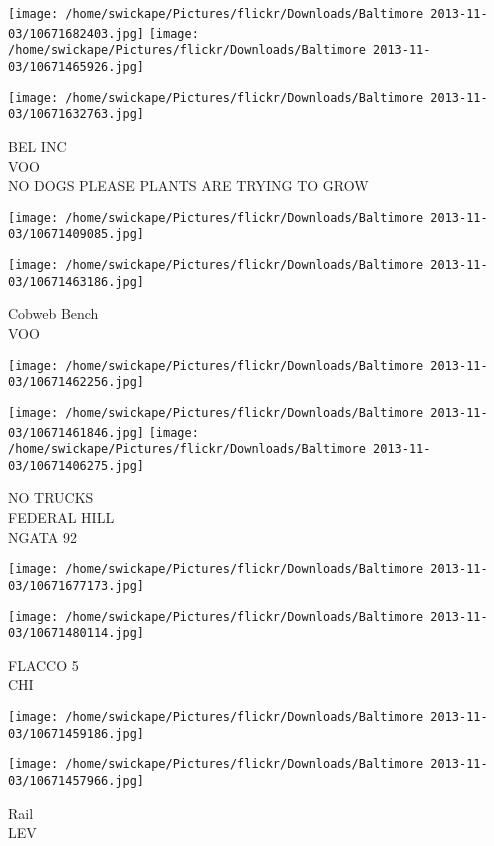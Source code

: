 \documentclass[10pt,letterpaper]{article}
\begin{document}
\texttt{[image: /home/swickape/Pictures/flickr/Downloads/Baltimore 2013-11-03/10671682403.jpg]}
\texttt{[image: /home/swickape/Pictures/flickr/Downloads/Baltimore 2013-11-03/10671465926.jpg]}

\texttt{[image: /home/swickape/Pictures/flickr/Downloads/Baltimore 2013-11-03/10671632763.jpg]}

BEL INC\\
VOO\\
NO DOGS PLEASE PLANTS ARE TRYING TO GROW
\pagebreak

\texttt{[image: /home/swickape/Pictures/flickr/Downloads/Baltimore 2013-11-03/10671409085.jpg]}

\vspace{0.25in}
\texttt{[image: /home/swickape/Pictures/flickr/Downloads/Baltimore 2013-11-03/10671463186.jpg]}

Cobweb Bench\\
VOO
\pagebreak

\texttt{[image: /home/swickape/Pictures/flickr/Downloads/Baltimore 2013-11-03/10671462256.jpg]}

\vspace{0.25in}
\texttt{[image: /home/swickape/Pictures/flickr/Downloads/Baltimore 2013-11-03/10671461846.jpg]}
\texttt{[image: /home/swickape/Pictures/flickr/Downloads/Baltimore 2013-11-03/10671406275.jpg]}

NO TRUCKS\\
FEDERAL HILL\\
NGATA 92
\pagebreak

\texttt{[image: /home/swickape/Pictures/flickr/Downloads/Baltimore 2013-11-03/10671677173.jpg]}

\vspace{0.25in}
\texttt{[image: /home/swickape/Pictures/flickr/Downloads/Baltimore 2013-11-03/10671480114.jpg]}

FLACCO 5\\
CHI
\pagebreak

\texttt{[image: /home/swickape/Pictures/flickr/Downloads/Baltimore 2013-11-03/10671459186.jpg]}

\vspace{0.25in}
\texttt{[image: /home/swickape/Pictures/flickr/Downloads/Baltimore 2013-11-03/10671457966.jpg]}

Rail\\
LEV
\pagebreak
\end{document}
